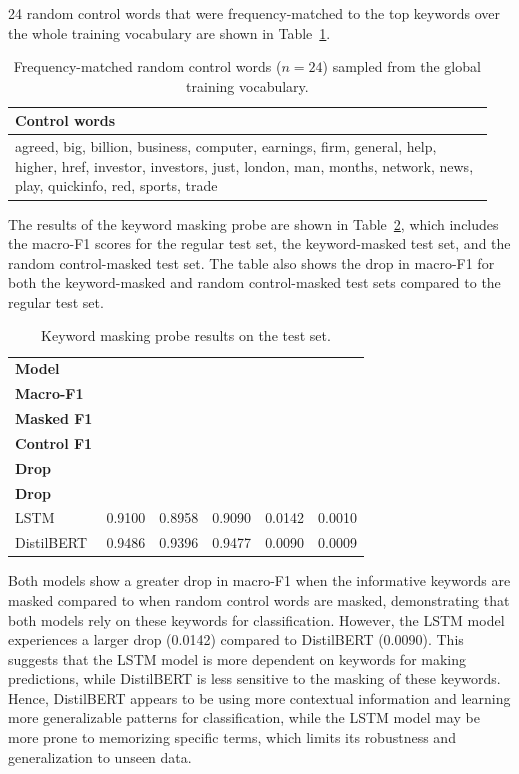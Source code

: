24 random control words that were frequency-matched to the top keywords over the whole training vocabulary are shown in Table~\ref{tab:control_words}.

\begin{table}[H]
\centering
\caption{Frequency-matched random control words (\(n=24\)) sampled from the global training vocabulary.}
\label{tab:control_words}
\begin{tabular}{p{0.95\linewidth}}
\toprule
\textbf{Control words} \\
\midrule
agreed, big, billion, business, computer, earnings, firm, general, help, higher, href, investor, investors, just, london, man, months, network, news, play, quickinfo, red, sports, trade \\
\bottomrule
\end{tabular}
\end{table}

The results of the keyword masking probe are shown in Table~\ref{tab:keyword_masking_probe}, which includes the macro-F1 scores for the regular test set, the keyword-masked test set, and the random control-masked test set. The table also shows the drop in macro-F1 for both the keyword-masked and random control-masked test sets compared to the regular test set.

\begin{table}[H]
\centering
\caption{Keyword masking probe results on the test set.}
\label{tab:keyword_masking_probe}
\begin{tabular}{lccccc}
\toprule
\textbf{Model} &
\shortstack{\textbf{Regular}\\\textbf{Macro-F1}} &
\shortstack{\textbf{Keyword-}\\\textbf{Masked F1}} &
\shortstack{\textbf{Random-}\\\textbf{Control F1}} &
\shortstack{\textbf{Keyword}\\\textbf{Drop}} &
\shortstack{\textbf{Random}\\\textbf{Drop}} \\
\midrule
LSTM & 0.9100 & 0.8958 & 0.9090 & 0.0142 & 0.0010 \\
DistilBERT & 0.9486 & 0.9396 & 0.9477 & 0.0090 & 0.0009 \\
\bottomrule
\end{tabular}
\end{table}

Both models show a greater drop in macro-F1 when the informative keywords are masked compared to when random control words are masked, demonstrating that both models rely on these keywords for classification. However, the LSTM model experiences a larger drop (0.0142) compared to DistilBERT (0.0090). This suggests that the LSTM model is more dependent on keywords for making predictions, while DistilBERT is less sensitive to the masking of these keywords. Hence, DistilBERT appears to be using more contextual information and learning more generalizable patterns for classification, while the LSTM model may be more prone to memorizing specific terms, which limits its robustness and generalization to unseen data.
